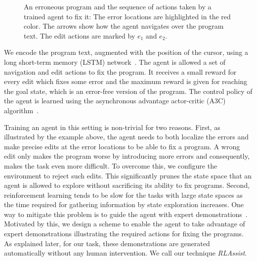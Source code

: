 \documentclass{article}
\begin{document}
\begin{figure}[t]
\caption{An erroneous program and the sequence of actions taken by a trained agent to
  fix it: The error locations are highlighted in the red color. The arrows show
  how the agent navigates over the program text. The edit actions are marked
  by $e_1$ and $e_2$.
}
\label{fig:RLAssist-illustraion}
\end{figure}

We encode the program text, augmented with the position of the cursor,
using a long short-term memory (LSTM) network~\cite{hochreiter1997long}.
The agent is allowed a set of navigation and edit actions to fix the program.
It receives a small reward for every edit which fixes some error and the maximum reward is given for reaching the goal state, which is an error-free version of the program.
The control policy of the agent is learned using the asynchronous advantage actor-critic (A3C) algorithm~\cite{mnih2016asynchronous}.

Training an agent in this setting is non-trivial for two reasons.
First, as illustrated by the example above, the agent needs to both localize
the errors and make precise edits at the error locations to be able to fix a program.
A wrong edit only makes the program worse by introducing more errors and
consequently, makes the task even more difficult.
To overcome this, we configure the environment to reject such edits.
This significantly prunes the state space that an agent is allowed to explore
without sacrificing its ability to fix programs. 
Second, reinforcement learning tends to be slow for the tasks with large state spaces as the time required for gathering information by state exploration increases.
One way to mitigate this problem is to guide the agent with expert demonstrations~\cite{Argall-2009-17073}.
Motivated by this, we design a scheme to 
enable the agent to take advantage of expert demonstrations
illustrating the required actions for fixing the programs.
As explained later, for our task, these demonstrations are generated automatically without any human intervention.
We call our technique \emph{RLAssist}.
\end{document}
